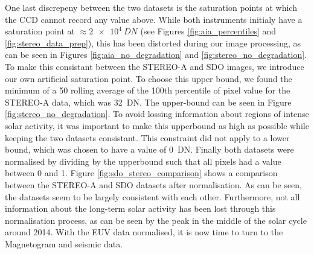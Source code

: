 \documentclass[11pt,a4paper,onecolumn]{report}
\begin{document}
One last discrepeny between the two datasets is the saturation points at which
the CCD cannot record any value above. While both instruments initialy have a
saturation point at $\approx \SI[]{2e4}[]{DN}$ (see Figures
\ref{fig:aia_percentiles} and \ref{fig:stereo_data_prep}), this has been
distorted during our image processing, as can be seen in Figures
\ref{fig:aia_no_degradation} and \ref{fig:stereo_no_degradation}. To make this
consistant between the STEREO-A and SDO images, we introduce our own artificial
saturation point. To choose this upper bound, we found the minimum of a 50
rolling average of the 100th percentile of pixel value for the STEREO-A data,
which was \SI[]{32}[]{DN}. The upper-bound can be seen in Figure
\ref{fig:stereo_no_degradation}. To avoid lossing information about regions of
intense solar activity, it was important to make this upperbound as high as
possible while keeping the two datasets consistant. This constraint did not
apply to a lower bound, which was chosen to have a value of \SI{0}{DN}. Finally
both datasets were normalised by dividing by the upperbound such that all pixels
had a value between 0 and 1. Figure \ref{fig:sdo_stereo_comparison} shows a
comparison between the STEREO-A and SDO datasets after normalisation. As can be
seen, the datasets seem to be largely consistent with each other. Furthermore,
not all information about the long-term solar activity has been lost through
this normalisation process, as can be seen by the peak in the middle of the
solar cycle around 2014. With the EUV data normalised, it is now time to turn to
the Magnetogram and seismic data. %
\end{document}
